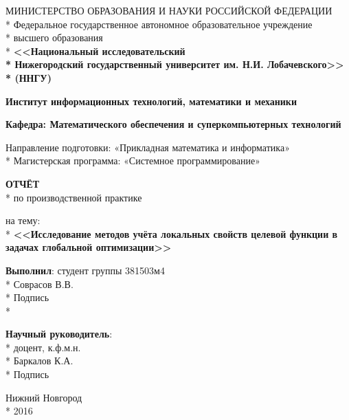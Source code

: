 \begin{titlepage}

\begin{center}
МИНИСТЕРСТВО ОБРАЗОВАНИЯ И НАУКИ РОССИЙСКОЙ ФЕДЕРАЦИИ \\*
Федеральное   государственное  автономное  образовательное  учреждение \\*
высшего образования \\*
\textbf{<<Национальный исследовательский \\*
Нижегородский государственный университет им. Н.И. Лобачевского>> \\*
(ННГУ)}
\end{center}

\vspace{12pt}

\begin{center}
\textbf{Институт информационных технологий, математики и механики}
\end{center}

\begin{center}
\textbf{Кафедра: Математического обеспечения и суперкомпьютерных технологий}
\end{center}

\vspace{25pt}
\begin{center}
Направление подготовки: «Прикладная математика и информатика» \\*
Магистерская программа: «Системное программирование»
\end{center}
\vspace{30pt}

\begin{center}
\fontsize{18pt}{0pt}\textbf{ОТЧЁТ} \\*
по производственной практике
\end{center}
\begin{center}
на тему: \\*
\fontsize{16pt}{0pt}\textbf{<<Исследование методов учёта локальных свойств целевой функции в задачах глобальной оптимизации>>}
\end{center}

\vspace{53pt}

\begin{flushright}
\textbf{Выполнил}: студент группы 381503м4 \\*
 Соврасов В.В. \\*
Подпись  \\*

\textbf{Научный руководитель}:  \\*
доцент, к.ф.м.н.  \\*
 Баркалов К.А. \\*
Подпись 
\end{flushright}

\vspace{\fill}

\begin{center}
Нижний Новгород \\*
2016
\end{center}

\end{titlepage}
